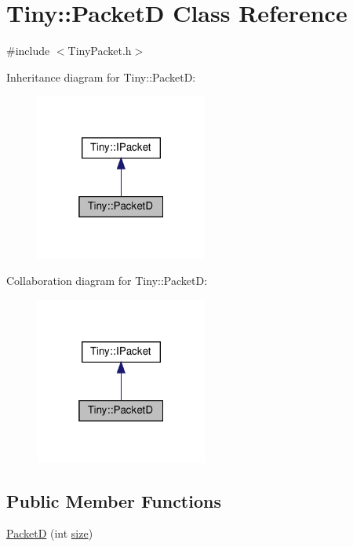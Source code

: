 \hypertarget{classTiny_1_1PacketD}{}\section{Tiny\+:\+:PacketD Class Reference}
\label{classTiny_1_1PacketD}


{\ttfamily \#include $<$Tiny\+Packet.\+h$>$}



Inheritance diagram for Tiny\+:\+:PacketD\+:
\nopagebreak
\begin{figure}[H]
\begin{center}
\leavevmode
\includegraphics[width=160pt]{classTiny_1_1PacketD__inherit__graph}
\end{center}
\end{figure}


Collaboration diagram for Tiny\+:\+:PacketD\+:
\nopagebreak
\begin{figure}[H]
\begin{center}
\leavevmode
\includegraphics[width=160pt]{classTiny_1_1PacketD__coll__graph}
\end{center}
\end{figure}
\subsection*{Public Member Functions}
\begin{DoxyCompactItemize}
\item 
\hyperlink{classTiny_1_1PacketD_a337a74c5e513be616aff0c1a0746612a}{PacketD} (int \hyperlink{classTiny_1_1IPacket_a76b6389f0d47b67c8428c58c2b09df51}{size})
\end{DoxyCompactItemize}


